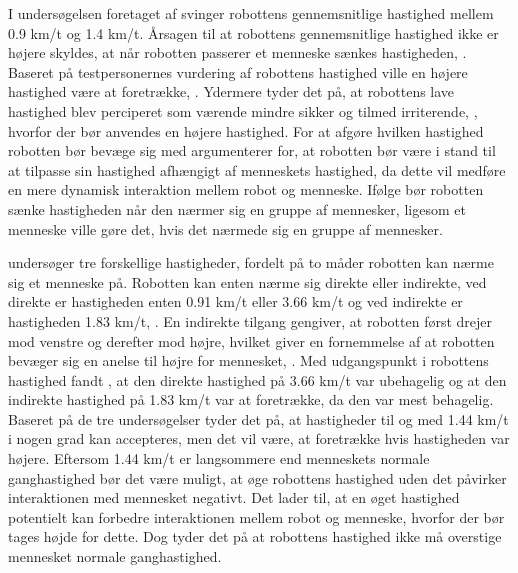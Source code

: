 I undersøgelsen foretaget af \textcite[s. 169]{PDF:HumanRobotEmodiedInteraction} svinger robottens gennemsnitlige hastighed mellem 0.9 km/t og 1.4 km/t. Årsagen til at robottens gennemsnitlige hastighed ikke er højere skyldes, at når robotten passerer et menneske sænkes hastigheden, \parencite[s. 169]{PDF:HumanRobotEmodiedInteraction}. Baseret på testpersonernes vurdering af robottens hastighed ville en højere hastighed være at foretrække, \parencite[s. 169]{PDF:HumanRobotEmodiedInteraction}. Ydermere tyder det på, at robottens lave hastighed blev perciperet som værende mindre sikker og tilmed irriterende, \parencite[s. 169]{PDF:HumanRobotEmodiedInteraction}, hvorfor der bør anvendes en højere hastighed. For at afgøre hvilken hastighed robotten bør bevæge sig med argumenterer \textcite[s. 167]{PDF:HumanRobotEmodiedInteraction} for, at robotten bør være i stand til at tilpasse sin hastighed afhængigt af menneskets hastighed, da dette vil medføre en mere dynamisk interaktion mellem robot og menneske. Ifølge \textcite[s. 1897]{PDF:NavigationForHRITasks} bør robotten sænke hastigheden når den nærmer sig en gruppe af mennesker, ligesom et menneske ville gøre det, hvis det nærmede sig en gruppe af mennesker.

\textcite[ss. 192-103]{PDF:PsychologicalEffects} undersøger tre forskellige hastigheder, fordelt på to måder robotten kan nærme sig et menneske på. Robotten kan enten nærme sig direkte eller indirekte, ved direkte er hastigheden enten 0.91 km/t eller 3.66 km/t og ved indirekte er hastigheden 1.83 km/t, \parencite[ss. 192-103]{PDF:PsychologicalEffects}. En indirekte tilgang gengiver, at robotten først drejer mod venstre og derefter mod højre, hvilket giver en fornemmelse af at robotten bevæger sig en anelse til højre for mennesket, \parencite[s. 193]{PDF:PsychologicalEffects}. Med udgangspunkt i robottens hastighed fandt \textcite[s. 196]{PDF:PsychologicalEffects}, at den direkte hastighed på 3.66 km/t var ubehagelig og at den indirekte hastighed på 1.83 km/t var at foretrække, da den var mest behagelig. \blankline  
%
Baseret på de tre undersøgelser tyder det på, at hastigheder til og med 1.44 km/t i nogen grad kan accepteres, men det vil være, at foretrække hvis hastigheden var højere. Eftersom 1.44 km/t er langsommere end menneskets normale ganghastighed bør det være muligt, at øge robottens hastighed uden det påvirker interaktionen med mennesket negativt. Det lader til, at en øget hastighed potentielt kan forbedre interaktionen mellem robot og menneske, hvorfor der bør tages højde for dette. Dog tyder det på at robottens hastighed ikke må overstige mennesket normale ganghastighed.       
%

